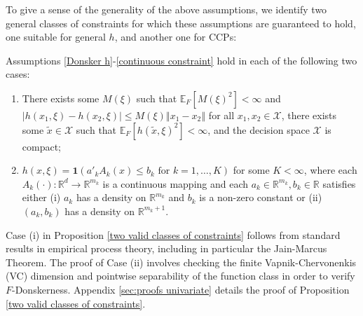 \documentclass[mnsc,blindrev]{informs4} %
\newcommand{\R}{\mathbb{R}}
\newcommand{\norm}[1]{\left \Vert #1 \right\Vert}
\newcommand{\abs}[1]{\left \vert #1 \right\vert}
\begin{document}
To give a sense of the generality of the above assumptions, we identify two general classes of constraints for which these assumptions are guaranteed to hold, one suitable for general $h$, and another one for CCPs:
\begin{proposition}\label{two valid classes of constraints}
Assumptions \ref{Donsker h}-\ref{continuous constraint} hold in each of the following two cases:
\begin{enumerate}
\item[i.]There exists some $M(\xi)$ such that $\mathbb E_F[M(\xi)^2]<\infty$ and $\abs{h(x_1,\xi)-h(x_2,\xi)}\leq M(\xi)\norm{x_1-x_2}$ for all $x_1,x_2\in\mathcal X$, there exists some $\tilde x\in\mathcal X$ such that $\mathbb E_F[h(\tilde x,\xi)^2]<\infty$, and the decision space $\mathcal X$ is compact;
\item[ii.]$h(x,\xi)=\mathbf{1}(a'_kA_k(x)\leq b_k\text{ for }k=1,\ldots,K)$ for some $K<\infty$, where each $A_k(\cdot):\R^d\to \R^{m_k}$ is a continuous mapping and each $a_k\in \R^{m_k},b_k\in \R$ satisfies either (i) $a_k$ has a density on $\R^{m_k}$ and $b_k$ is a non-zero constant or (ii) $(a_k,b_k)$ has a density on $\R^{m_k+1}$.
\end{enumerate}
\end{proposition}
Case (i) in Proposition \ref{two valid classes of constraints} follows from standard results in empirical process theory,  including in particular the Jain-Marcus Theorem. The proof of Case (ii) involves checking the finite Vapnik-Chervonenkis (VC) dimension and pointwise separability of the function class in order to verify $F$-Donskerness. Appendix \ref{sec:proofs univariate} details the proof of Proposition \ref{two valid classes of constraints}.
\end{document}
